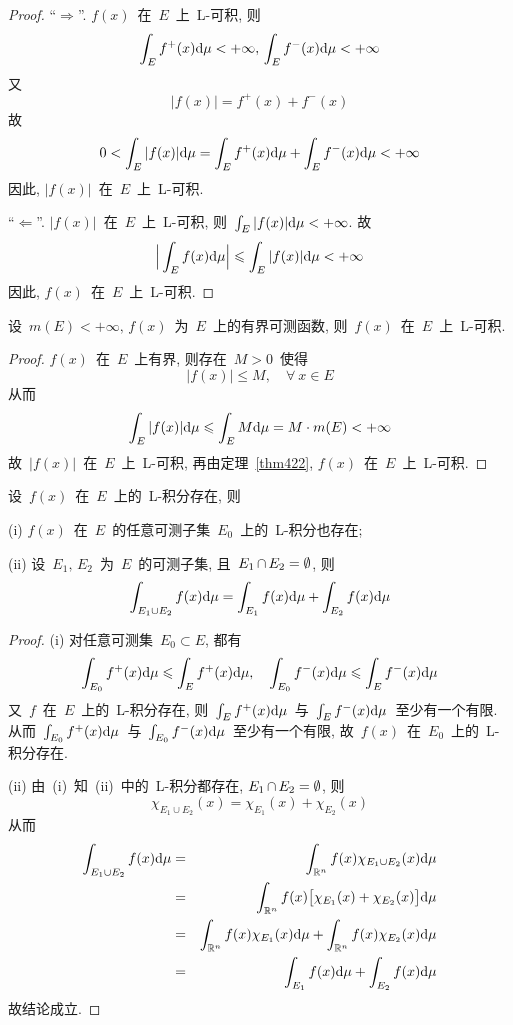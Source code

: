 \begin{proof}
``$\Rightarrow$''. $f(x)$~在~$E$~上~L-可积, 则
\[
\int_E f^+(x) \mathrm{d} \mu < +\infty, \, \int_E f^-(x) \mathrm{d} \mu < +\infty
\]
又
\[
|f(x)| = f^+(x) + f^-(x)
\]
故
\[
0 < \int_E |f(x)| \mathrm{d} \mu = \int_E f^+(x) \mathrm{d} \mu + \int_E f^-(x) \mathrm{d} \mu < +\infty
\]
因此, $|f(x)|$~在~$E$~上~L-可积.

``$\Leftarrow$''. $|f(x)|$~在~$E$~上~L-可积, 则~$\int_E |f(x)| \mathrm{d} \mu < +\infty$. 故
\[
\Big|\int_E f(x) \mathrm{d} \mu \Big| \leqslant \int_E |f(x)| \mathrm{d} \mu < +\infty
\]
因此, $f(x)$~在~$E$~上~L-可积.
\end{proof}

\begin{theorem}
设~$m(E) < +\infty,\,  f(x)$~为~$E$~上的有界可测函数, 则~$f(x)$~在~$E$~上~L-可积.
\end{theorem}

\begin{proof}
$f(x)$~在~$E$~上有界, 则存在~$M > 0$~使得
\[
|f(x)| \leqslant M, \quad  \forall~x \in E
\]
从而
\[
\int_E |f(x)| \mathrm{d} \mu \leqslant \int_E M \mathrm{d} \mu = M \cdot m(E) < +\infty
\]
故~$|f(x)|$~在~$E$~上~L-可积, 再由定理~\ref{thm422}, $f(x)$~在~$E$~上~L-可积.
\end{proof}

\begin{proposition}
设~$f(x)$~在~$E$~上的~L-积分存在, 则

(i) $f(x)$~在~$E$~的任意可测子集~$E_0$~上的~L-积分也存在;

(ii) 设~$E_1,\, E_2$~为~$E$~的可测子集, 且~$E_1 \mathop{\cap} E_2 = \emptyset$, 则
\[
\int_{E_1 \cup E_2} f(x) \mathrm{d} \mu = \int_{E_1} f(x) \mathrm{d} \mu + \int_{E_2} f(x) \mathrm{d} \mu
\]
\end{proposition}

\begin{proof}
(i) 对任意可测集~$E_0 \subset E$, 都有
\[
\int_{E_0} f^+(x) \mathrm{d} \mu \leqslant \int_E f^+(x) \mathrm{d} \mu,
\quad \int_{E_0} f^-(x) \mathrm{d} \mu \leqslant \int_E f^-(x) \mathrm{d} \mu
\]
又~$f$~在~$E$~上的~L-积分存在, 则~$\int_E f^+(x) \mathrm{d} \mu$~与~$\int_E f^-(x) \mathrm{d} \mu$~至少有一个有限. 从而~$\int_{E_0} f^+(x) \mathrm{d} \mu$~与~$\int_{E_0} f^-(x) \mathrm{d} \mu$~至少有一个有限,  故~$f(x)$~在~$E_0$~上的~L-积分存在.

(ii) 由~(i)~知~(ii)~中的~L-积分都存在, $E_1 \mathop{\cap} E_2 = \emptyset$, 则
\[
\chi_{E_1 \cup E_2}(x) = \chi_{E_1}(x) + \chi_{E_2}(x)
\]
从而
\begin{eqnarray*}
\int_{E_1 \cup E_2} f(x) \mathrm{d} \mu &=& \int_{\mathbb{R}^n} f(x) \chi_{E_1 \cup E_2}(x) \mathrm{d} \mu \\
&=& \int_{\mathbb{R}^n} f(x) \big[\chi_{E_1}(x) + \chi_{E_2}(x) \big] \mathrm{d} \mu \\
&=& \int_{\mathbb{R}^n} f(x) \chi_{E_1}(x) \mathrm{d} \mu + \int_{\mathbb{R}^n} f(x) \chi_{E_2}(x) \mathrm{d} \mu \\
&=& \int_{E_1} f(x) \mathrm{d} \mu + \int_{E_2} f(x) \mathrm{d} \mu
\end{eqnarray*}
故结论成立.
\end{proof}

